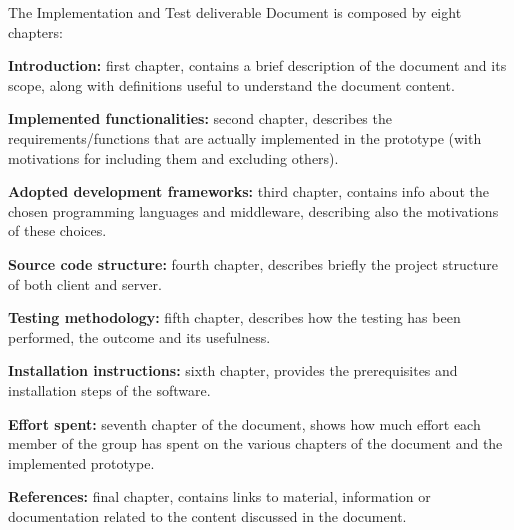 The Implementation and Test deliverable Document is composed by eight chapters:

\textbf{Introduction:} first chapter, contains a brief description of the document and its scope, along with definitions useful to understand the document content.

\textbf{Implemented functionalities:} second chapter, describes the requirements/functions that are actually implemented in the prototype (with motivations for including them and excluding others).

\textbf{Adopted development frameworks:} third chapter, contains info about the chosen programming languages and middleware, describing also the motivations of these choices.

\textbf{Source code structure:} fourth chapter, describes briefly the project structure of both client and server.

\textbf{Testing methodology:} fifth chapter, describes how the testing has been performed, the outcome and its usefulness.

\textbf{Installation instructions:} sixth chapter, provides the prerequisites and installation steps of the software.

\textbf{Effort spent:} seventh chapter of the document, shows how much effort each member of the group has spent on the various chapters of the document and the implemented prototype.

\textbf{References:} final chapter, contains links to material, information or documentation related to the content discussed in the document.